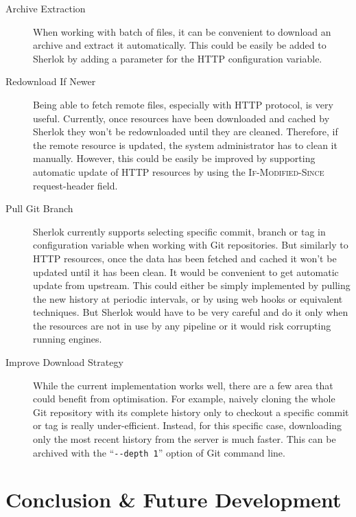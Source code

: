 \documentclass{article}
\newcommand{\ID}[1]{{\textsc{#1}}}
\begin{document}
\begin{description}

    \item[Archive Extraction] When working with batch of files, it can be convenient to download an
        archive and extract it automatically. This could be easily be added to Sherlok by adding a
        parameter for the HTTP configuration variable.

    \item[Redownload If Newer] Being able to fetch remote files, especially with HTTP protocol, is
        very useful. Currently, once resources have been downloaded and cached by Sherlok they won't
        be redownloaded until they are cleaned. Therefore, if the remote resource is updated, the
        system administrator has to clean it manually. However, this could be easily be improved by
        supporting automatic update of HTTP resources by using the \ID{If-Modified-Since}
        request-header field.

    \item[Pull Git Branch] Sherlok currently supports selecting specific commit, branch or tag in
        configuration variable when working with Git repositories. But similarly to HTTP resources,
        once the data has been fetched and cached it won't be updated until it has been clean. It
        would be convenient to get automatic update from upstream. This could either be simply
        implemented by pulling the new history at periodic intervals, or by using web hooks or
        equivalent techniques. But Sherlok would have to be very careful and do it only when the
        resources are not in use by any pipeline or it would risk corrupting running engines.

    \item[Improve Download Strategy] While the current implementation works well, there are a few
        area that could benefit from optimisation. For example, naively cloning the whole Git
        repository with its complete history only to checkout a specific commit or tag is really
        under-efficient. Instead, for this specific case, downloading only the most recent history
        from the server is much faster. This can be archived with the ``\verb#--depth 1#'' option of
        Git command line.

\end{description}

\section{Conclusion \& Future Development}
\end{document}
